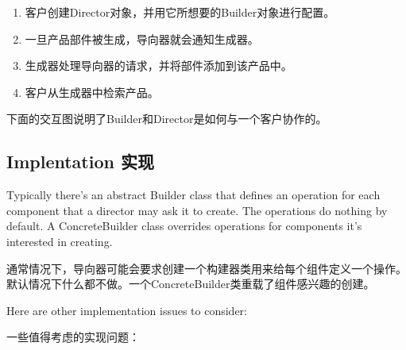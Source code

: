 \begin{enumerate}

\item 客户创建Director对象，并用它所想要的Builder对象进行配置。

\item 一旦产品部件被生成，导向器就会通知生成器。

\item 生成器处理导向器的请求，并将部件添加到该产品中。

\item 客户从生成器中检索产品。

\end{enumerate}

下面的交互图说明了Builder和Director是如何与一个客户协作的。



\subsection{Implentation 实现}

Typically there's an abstract Builder class that defines an operation for each component that a director may ask it to create. The operations do nothing by default. A ConcreteBuilder class overrides operations for components it's interested in creating.

通常情况下，导向器可能会要求创建一个构建器类用来给每个组件定义一个操作。默认情况下什么都不做。一个ConcreteBuilder类重载了组件感兴趣的创建。

Here are other implementation issues to consider:

一些值得考虑的实现问题：

